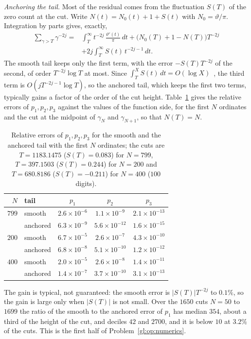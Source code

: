 \emph{Anchoring the tail.} Most of the residual comes from the fluctuation $S(T)$ of the zero count at the cut. Write $N(t)=N_0(t)+1+S(t)$ with $N_0=\vartheta/\pi$. Integration by parts gives, exactly,
\begin{equation}\label{gl:eq:anchored}
\begin{aligned}
\sum_{\gamma>T}\gamma^{-2j}={}&\int_T^\infty t^{-2j}\,\frac{\vartheta'(t)}{\pi}\,dt+\big(N_0(T)+1-N(T)\big)T^{-2j}\\
&+2j\int_T^\infty S(t)\,t^{-2j-1}\,dt .
\end{aligned}
\end{equation}
The smooth tail keeps only the first term, with the error $-S(T)T^{-2j}$ of the second, of order $T^{-2j}\log T$ at most. Since $\int_T^XS(t)\,dt=O(\log X)$~\cite[Section~9.9]{Titchmarsh}, the third term is $O(jT^{-2j-1}\log T)$, so the anchored tail, which keeps the first two terms, typically gains a factor of the order of the cut height. Table~\ref{gl:tab:anchored} gives the relative errors of $p_1,p_2,p_3$ against the values of the function side, for the first $N$ ordinates and the cut at the midpoint of $\gamma_N$ and $\gamma_{N+1}$, so that $N(T)=N$.
\begin{table}[htbp]
\caption{Relative errors of $p_1,p_2,p_3$ for the smooth and the anchored tail with the first $N$ ordinates; the cuts are $T=1183.1475$ ($S(T)=0.083$) for $N=799$, $T=397.1503$ ($S(T)=0.244$) for $N=200$ and $T=680.8186$ ($S(T)=-0.211$) for $N=400$ ($100$ digits).}
\label{gl:tab:anchored}
\centering
\small
\begin{tabular}{rlccc}
\toprule
$N$ & tail & $p_1$ & $p_2$ & $p_3$\\
\midrule
$799$ & smooth & $2.6\times10^{-6}$ & $1.1\times10^{-9}$ & $2.1\times10^{-13}$\\
 & anchored & $6.3\times10^{-9}$ & $5.6\times10^{-12}$ & $1.6\times10^{-15}$\\
\addlinespace
$200$ & smooth & $6.7\times10^{-5}$ & $2.6\times10^{-7}$ & $4.3\times10^{-10}$\\
 & anchored & $6.8\times10^{-8}$ & $5.1\times10^{-10}$ & $1.2\times10^{-12}$\\
\addlinespace
$400$ & smooth & $2.0\times10^{-5}$ & $2.6\times10^{-8}$ & $1.4\times10^{-11}$\\
 & anchored & $1.4\times10^{-7}$ & $3.7\times10^{-10}$ & $3.1\times10^{-13}$\\
\bottomrule
\end{tabular}
\end{table}
The gain is typical, not guaranteed: the smooth error is $|S(T)|T^{-2j}$ to $0.1\%$, so the gain is large only when $|S(T)|$ is not small. Over the $1650$ cuts $N=50$ to $1699$ the ratio of the smooth to the anchored error of $p_1$ has median $354$, about a third of the height of the cut, and deciles $42$ and $2700$, and it is below $10$ at $3.2\%$ of the cuts. This is the first half of Problem~\ref{gl:op:numerics}.


